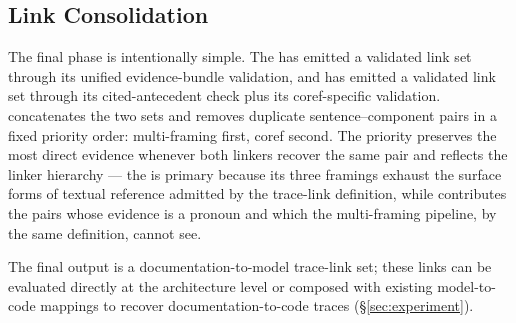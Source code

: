 \subsection{Link Consolidation}\label{sec:merge}

The final phase is intentionally simple.
The \multiframing has emitted a validated link set through its
unified evidence-bundle validation, and \coref has emitted a
validated link set through its cited-antecedent check plus its
coref-specific validation.
\approach concatenates the two sets and removes duplicate
sentence--component pairs in a fixed priority order: multi-framing
first, coref second.
The priority preserves the most direct evidence whenever both
linkers recover the same pair and reflects the linker hierarchy ---
the \multiframing is primary because its three framings exhaust
the surface forms of textual reference admitted by the trace-link
definition, while \coref contributes the pairs whose evidence is
a pronoun and which the multi-framing pipeline, by the same
definition, cannot see.

The final output is a documentation-to-model trace-link set; these
links can be evaluated directly at the architecture level or
composed with existing model-to-code mappings to recover
documentation-to-code traces (\S\ref{sec:experiment}).
